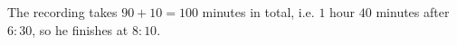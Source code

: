 The recording takes $90+10=100$ minutes in total, i.e. $1$ hour $40$ minutes after $6{:}30$, so he finishes at $\boxed{8{:}10}$.

